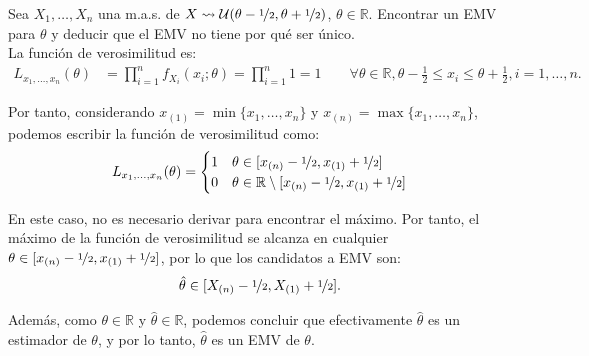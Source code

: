 \begin{ejemplo}
    Sea $X_1, \ldots, X_n$ una m.a.s. de $X \rightsquigarrow \mathcal{U}(\theta - \nicefrac{1}{2}, \theta + \nicefrac{1}{2})$, $\theta \in \mathbb{R}$. Encontrar un EMV para $\theta$ y deducir que el EMV no tiene por qué ser único.\\

    La función de verosimilitud es:
    \begin{align*}
        L_{x_1, \ldots, x_n}(\theta) &= \prod_{i=1}^{n} f_{X_i}(x_i; \theta) = \prod_{i=1}^{n} 1 = 1 \qquad \forall \theta \in \mathbb{R}, \theta - \frac{1}{2} \leq x_i \leq \theta + \frac{1}{2}, i = 1, \ldots, n.
    \end{align*}

    Por tanto, considerando $x_{(1)} = \min\{x_1, \ldots, x_n\}$ y $x_{(n)} = \max\{x_1, \ldots, x_n\}$, podemos escribir la función de verosimilitud como:
    \begin{align*}
        L_{x_1, \ldots, x_n}(\theta) = \begin{cases}
            1 & \theta \in [x_{(n)} - \nicefrac{1}{2}, x_{(1)} + \nicefrac{1}{2}]\\
            0 & \theta \in \mathbb{R} \setminus [x_{(n)} - \nicefrac{1}{2}, x_{(1)} + \nicefrac{1}{2}]
        \end{cases}
    \end{align*}

    En este caso, no es necesario derivar para encontrar el máximo. Por tanto, el máximo de la función de verosimilitud se alcanza en cualquier $\theta \in [x_{(n)} - \nicefrac{1}{2}, x_{(1)} + \nicefrac{1}{2}]$, por lo que los candidatos a EMV son:
    \begin{align*}
        \hat{\theta} \in [X_{(n)} - \nicefrac{1}{2}, X_{(1)} + \nicefrac{1}{2}].
    \end{align*}

    Además, como $\theta\in \mathbb{R}$ y $\hat{\theta}\in \mathbb{R}$, podemos concluir que efectivamente $\hat{\theta}$ es un estimador de $\theta$, y por lo tanto, $\hat{\theta}$ es un EMV de $\theta$.
\end{ejemplo}

